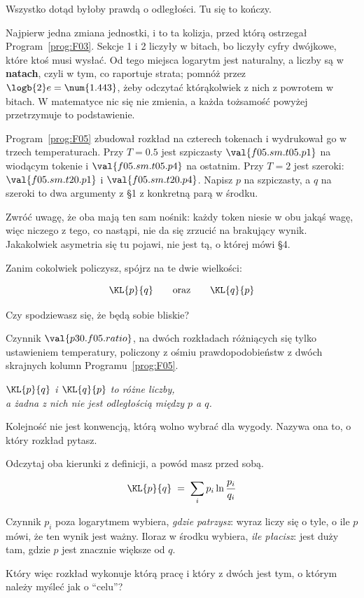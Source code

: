 \begin{fr}
Wszystko dotąd byłoby prawdą o odległości. Tu się to kończy.

Najpierw jedna zmiana jednostki, i to ta kolizja, przed którą ostrzegał
Program~\ref{prog:F03}. Sekcje 1 i 2 liczyły w bitach, bo liczyły cyfry
dwójkowe, które ktoś musi wysłać. Od tego miejsca logarytm jest naturalny, a
liczby są w \textbf{natach}, czyli w tym, co raportuje strata; pomnóż przez
$\logb{2} e = \num{1.443}$, żeby odczytać którąkolwiek z nich z powrotem w
bitach. W matematyce nic się nie zmienia, a każda tożsamość powyżej
przetrzymuje to podstawienie.

Program~\ref{prog:F05} zbudował rozkład na czterech tokenach i wydrukował go
w trzech temperaturach. Przy $T = \num{0.5}$ jest szpiczasty \dash{}
$\val{f05.sm.t05.p1}$ na wiodącym tokenie i $\val{f05.sm.t05.p4}$ na
ostatnim. Przy $T = 2$ jest szeroki: $\val{f05.sm.t20.p1}$ i
$\val{f05.sm.t20.p4}$. Napisz $p$ na szpiczasty, a $q$ na szeroki \dash{} to
dwa argumenty z §1 z konkretną parą w środku.

Zwróć uwagę, że oba mają ten sam nośnik: każdy token niesie w obu jakąś
wagę, więc niczego z tego, co nastąpi, nie da się zrzucić na brakujący wynik.
Jakakolwiek asymetria się tu pojawi, nie jest tą, o której mówi §4.

Zanim cokolwiek policzysz, spójrz na te dwie wielkości:

\[ \KL{p}{q} \qquad\text{oraz}\qquad \KL{q}{p} \]

Czy spodziewasz się, że będą sobie bliskie?
\dotline
\nextframe
\end{fr}

\begin{fr}

Czynnik $\val{p30.f05.ratio}$, na dwóch rozkładach różniących się tylko
ustawieniem temperatury, policzony z ośmiu prawdopodobieństw z dwóch
skrajnych kolumn Programu~\ref{prog:F05}.

\begin{center}
\emph{$\KL{p}{q}$ i $\KL{q}{p}$ to różne liczby,\\
a żadna z nich nie jest odległością między $p$ a $q$.}
\end{center}

Kolejność nie jest konwencją, którą wolno wybrać dla wygody. Nazywa ona to,
o który rozkład pytasz.
\end{fr}

\begin{fr}
Odczytaj oba kierunki z definicji, a powód masz przed sobą.

\[ \KL{p}{q} \;=\; \sum_i p_i \ln\frac{p_i}{q_i} \]

Czynnik $p_i$ poza logarytmem wybiera, \emph{gdzie patrzysz}: wyraz liczy się
o tyle, o ile $p$ mówi, że ten wynik jest ważny. Iloraz w środku wybiera,
\emph{ile płacisz}: jest duży tam, gdzie $p$ jest znacznie większe od $q$.

Który więc rozkład wykonuje którą pracę i który z dwóch jest tym, o którym
należy myśleć jak o \enquote{celu}?
\dotline
\nextframe
\end{fr}

